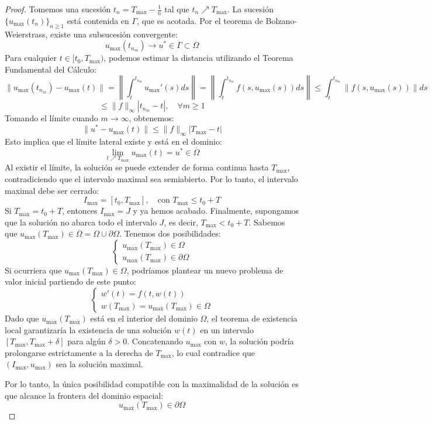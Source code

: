 \begin{proof}
    Tomemos una sucesión $t_n = T_{\text{max}} - \frac{1}{n}$ tal que $t_n \nearrow T_{\text{max}}$. La sucesión $\{ u_{\text{max}}(t_n) \}_{n \geq 1}$ está contenida en $\Gamma$, que es acotada. Por el teorema de Bolzano-Weierstrass, existe una subsucesión convergente:
    \[
        u_{\text{max}}(t_{n_m}) \to u^* \in \overline{\Gamma} \subset \overline{\Omega}
    \]
    Para cualquier $t \in [t_0, T_{\text{max}})$, podemos estimar la distancia utilizando el Teorema Fundamental del Cálculo:
    \[
        \| u_{\text{max}}(t_{n_m}) - u_{\text{max}}(t) \| = \left\| \int_t^{t_{n_m}} u_{\text{max}}'(s) ds \right\| = \left\| \int_t^{t_{n_m}} f(s, u_{\text{max}}(s)) ds \right\| \leq \int_t^{t_{n_m}} \| f(s, u_{\text{max}}(s)) \| ds 
    \]
    \[
        \leq \| f \|_\infty | t_{n_m} - t |, \quad \forall m \geq 1
    \]
    Tomando el límite cuando $m \to \infty$, obtenemos:
    \[
        \| u^* - u_{\text{max}}(t) \| \leq \| f \|_\infty | T_{\text{max}} - t |
    \]
    Esto implica que el límite lateral existe y está en el dominio:
    \[
        \lim_{t \nearrow T_{\text{max}}} u_{\text{max}}(t) = u^* \in \overline{\Omega}
    \]
    Al existir el límite, la solución se puede extender de forma continua hasta $T_{\text{max}}$, contradiciendo que el intervalo maximal sea semiabierto. Por lo tanto, el intervalo maximal debe ser cerrado:
    \[
        I_{\text{max}} = [t_0, T_{\text{max}}], \quad \text{con } T_{\text{max}} \leq t_0 + T
    \]
    Si $T_{\text{max}} = t_0 + T$, entonces $I_{\text{max}} = J$ y ya hemos acabado. Finalmente, supongamos que la solución no abarca todo el intervalo $J$, es decir, $T_{\text{max}} < t_0 + T$. Sabemos que $u_{\text{max}}(T_{\text{max}}) \in \overline{\Omega} = \Omega \cup \partial \Omega$. Tenemos dos posibilidades:
    \[
        \begin{cases}
            u_{\text{max}}(T_{\text{max}}) \in \Omega \\
            u_{\text{max}}(T_{\text{max}}) \in \partial \Omega
        \end{cases}
    \]
    Si ocurriera que $u_{\text{max}}(T_{\text{max}}) \in \Omega$, podríamos plantear un nuevo problema de valor inicial partiendo de este punto:
    \[
        \begin{cases}
            w'(t) = f(t, w(t)) \\
            w(T_{\text{max}}) = u_{\text{max}}(T_{\text{max}}) \in \Omega
        \end{cases}
    \]
    Dado que $u_{\text{max}}(T_{\text{max}})$ está en el interior del dominio $\Omega$, el teorema de existencia local garantizaría la existencia de una solución $w(t)$ en un intervalo $[T_{\text{max}}, T_{\text{max}} + \delta]$ para algún $\delta > 0$. Concatenando $u_{\text{max}}$ con $w$, la solución podría prolongarse estrictamente a la derecha de $T_{\text{max}}$, lo cual contradice que $(I_{\text{max}}, u_{\text{max}})$ sea la solución maximal.
    
    Por lo tanto, la única posibilidad compatible con la maximalidad de la solución es que alcance la frontera del dominio espacial:
    \[
        u_{\text{max}}(T_{\text{max}}) \in \partial \Omega
    \]
\end{proof}
